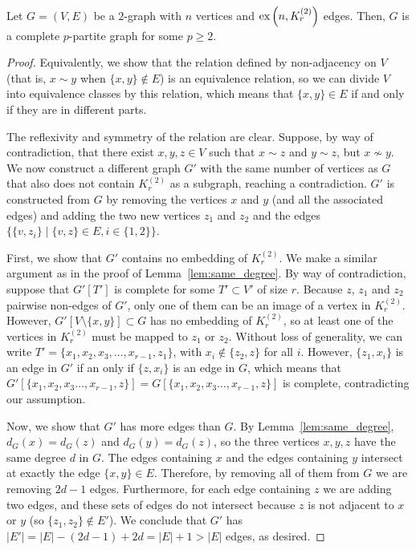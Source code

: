 \begin{lemma} \label{lem:turan_complete_partite}
    Let $G = (V, E)$ be a $2$-graph with $n$ vertices and
    $\text{ex} \left( n, K^{(2)}_{r} \right)$ edges.
    Then, $G$ is a complete $p$-partite graph for some $p \geq 2$.
    \begin{proof}
        Equivalently, we show that the relation defined by non-adjacency on $V$ (that is, $x \sim y$ when
        $\{x, y\} \notin E$) is an equivalence relation, so we can divide $V$ into equivalence classes
        by this relation, which means that $\{x, y\} \in E$ if and only if they are in different parts.

        The reflexivity and symmetry of the relation are clear.
        Suppose, by way of contradiction, that there exist $x, y, z \in V$ such that
        $x \sim z$ and $y \sim z$, but $x \nsim y$.
        We now construct a different graph $G'$ with the same number of vertices as $G$
        that also does not contain $K_r^{(2)}$ as a subgraph, reaching a contradiction.
        $G'$ is constructed from $G$ by removing the vertices
        $x$ and $y$ (and all the associated edges) and adding the two new vertices
        $z_1$ and $z_2$ and the edges $\{\{v, z_i\} \mid \{v, z\} \in E, i \in \{1, 2\}\}$.

        First, we show that $G'$ contains no embedding of $K_r^{(2)}$.
        We make a similar argument as in the proof of Lemma~\ref{lem:same_degree}.
        By way of contradiction, suppose that $G'[T']$ is complete for some $T' \subset V'$ of size $r$.
        Because $z$, $z_1$ and $z_2$ pairwise non-edges of $G'$, only one of them can be
        an image of a vertex in $K_r^{(2)}$.
        However, $G'[V \setminus \{x, y\}] \subset G$ has no embedding of $K_r^{(2)}$,
        so at least one of the vertices in $K_r^{(2)}$ must be mapped to $z_1$ or $z_2$.
        Without loss of generality, we can write $T' = \{x_1, x_2, x_3, \dots, x_{r-1}, z_1\}$,
        with $x_i \notin \{z_2, z\}$ for all $i$.
        However, $\{z_1, x_i\}$ is an edge in $G'$ if an only if $\{z, x_i\}$ is an edge in $G$,
        which means that $G'[\{x_1, x_2, x_3 \dots, x_{r-1}, z\}] = G[\{x_1, x_2, x_3 \dots, x_{r-1}, z\}]$ is complete,
        contradicting our assumption.

        Now, we show that $G'$ has more edges than $G$.
        By Lemma~\ref{lem:same_degree}, $d_G(x) = d_G(z)$ and $d_G(y) = d_G(z)$,
        so the three vertices $x, y, z$ have the same degree $d$ in $G$.
        The edges containing $x$ and the edges containing $y$ intersect at exactly the edge $\{x, y\} \in E$.
        Therefore, by removing all of them from $G$ we are removing $2d - 1$ edges.
        Furthermore, for each edge containing $z$ we are adding two edges,
        and these sets of edges do not intersect because $z$ is not adjacent to $x$ or $y$ (so $\{z_1, z_2\} \notin E'$).
        We conclude that $G'$ has $|E'| = |E| - (2d - 1) + 2d = |E| + 1 > |E| $ edges, as desired.
    \end{proof}
\end{lemma}

